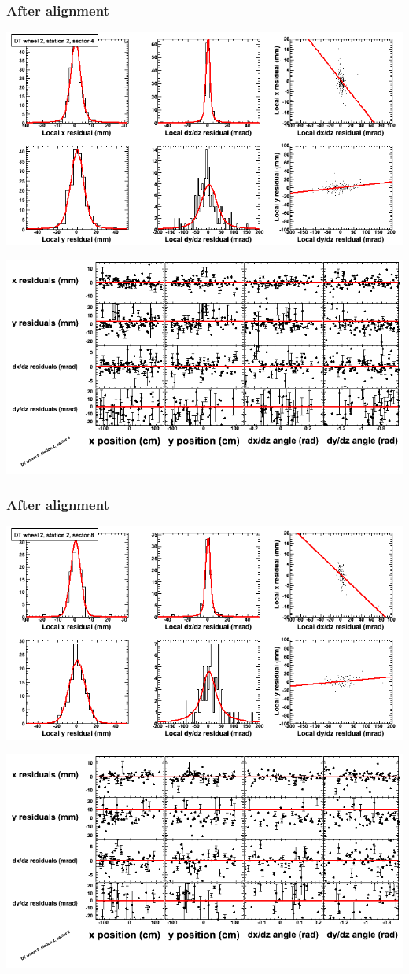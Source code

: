 \documentclass[compress]{beamer}
\begin{document}
\begin{frame}
\frametitle{After alignment}
\includegraphics[width=0.7\linewidth]{NOV4_fitfunctions/MBwhEst2sec04_bellcurves.png}

\includegraphics[width=0.7\linewidth]{NOV4_fitfunctions/MBwhEst2sec04_polynomials.png}
\end{frame}

\begin{frame}
\frametitle{After alignment}
\includegraphics[width=0.7\linewidth]{NOV4_fitfunctions/MBwhEst2sec08_bellcurves.png}

\includegraphics[width=0.7\linewidth]{NOV4_fitfunctions/MBwhEst2sec08_polynomials.png}
\end{frame}
\end{document}
